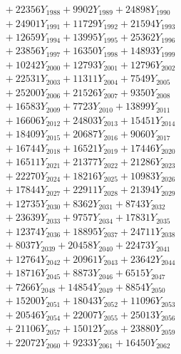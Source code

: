 \documentclass[a4paper,10pt]{article}
\begin{document}
{\begin{align}
&\;  + 22356 Y_{1988} + 9902 Y_{1989} + 24898 Y_{1990} \\[0.3ex]
&\;  + 24901 Y_{1991} + 11729 Y_{1992} + 21594 Y_{1993} \\[0.3ex]
&\;  + 12659 Y_{1994} + 13995 Y_{1995} + 25362 Y_{1996} \\[0.3ex]
&\;  + 23856 Y_{1997} + 16350 Y_{1998} + 14893 Y_{1999} \\[0.3ex]
&\;  + 10242 Y_{2000} + 12793 Y_{2001} + 12796 Y_{2002} \\[0.3ex]
&\;  + 22531 Y_{2003} + 11311 Y_{2004} + 7549 Y_{2005} \\[0.3ex]
&\;  + 25200 Y_{2006} + 21526 Y_{2007} + 9350 Y_{2008} \\[0.5ex]\allowbreak
&\;  + 16583 Y_{2009} + 7723 Y_{2010} + 13899 Y_{2011} \\[0.3ex]
&\;  + 16606 Y_{2012} + 24803 Y_{2013} + 15451 Y_{2014} \\[0.3ex]
&\;  + 18409 Y_{2015} + 20687 Y_{2016} + 9060 Y_{2017} \\[0.3ex]
&\;  + 16744 Y_{2018} + 16521 Y_{2019} + 17446 Y_{2020} \\[0.3ex]
&\;  + 16511 Y_{2021} + 21377 Y_{2022} + 21286 Y_{2023} \\[0.3ex]
&\;  + 22270 Y_{2024} + 18216 Y_{2025} + 10983 Y_{2026} \\[0.3ex]
&\;  + 17844 Y_{2027} + 22911 Y_{2028} + 21394 Y_{2029} \\[0.3ex]
&\;  + 12735 Y_{2030} + 8362 Y_{2031} + 8743 Y_{2032} \\[0.3ex]
&\;  + 23639 Y_{2033} + 9757 Y_{2034} + 17831 Y_{2035} \\[0.3ex]
&\;  + 12374 Y_{2036} + 18895 Y_{2037} + 24711 Y_{2038} \\[0.5ex]\allowbreak
&\;  + 8037 Y_{2039} + 20458 Y_{2040} + 22473 Y_{2041} \\[0.3ex]
&\;  + 12764 Y_{2042} + 20961 Y_{2043} + 23642 Y_{2044} \\[0.3ex]
&\;  + 18716 Y_{2045} + 8873 Y_{2046} + 6515 Y_{2047} \\[0.3ex]
&\;  + 7266 Y_{2048} + 14854 Y_{2049} + 8854 Y_{2050} \\[0.3ex]
&\;  + 15200 Y_{2051} + 18043 Y_{2052} + 11096 Y_{2053} \\[0.3ex]
&\;  + 20546 Y_{2054} + 22007 Y_{2055} + 25013 Y_{2056} \\[0.3ex]
&\;  + 21106 Y_{2057} + 15012 Y_{2058} + 23880 Y_{2059} \\[0.3ex]
&\;  + 22072 Y_{2060} + 9233 Y_{2061} + 16450 Y_{2062} \\[0.3ex]

\end{align}}
\end{document}
